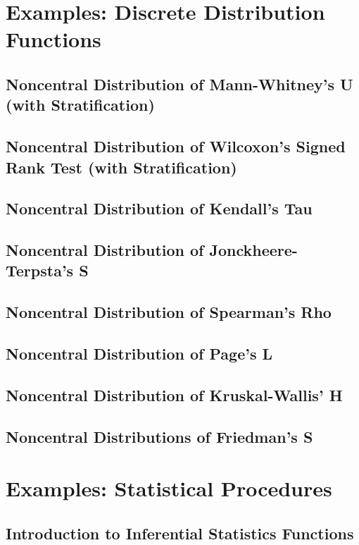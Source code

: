 \documentclass[12pt,a4paper,openany]{book}
\begin{document}
\chapter{Examples: Discrete Distribution Functions}

\section{Noncentral Distribution of Mann-Whitney's U (with Stratification)}

\section{Noncentral Distribution of Wilcoxon's Signed Rank Test (with Stratification)}

\section{Noncentral Distribution of Kendall's Tau}

\section{Noncentral Distribution of Jonckheere-Terpsta's S}

\section{Noncentral Distribution of Spearman's Rho}

\section{Noncentral Distribution of Page's L}

\section{Noncentral Distribution of Kruskal-Wallis' H}

\section{Noncentral Distributions of Friedman's S}

\chapter{Examples: Statistical Procedures}

\section{Introduction to Inferential Statistics Functions}
\end{document}
